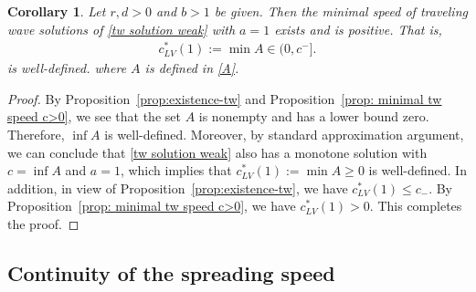 \documentclass[11pt,a4paper]{article}
\newtheorem{corollary}[theorem]{\textbf{Corollary}}
\numberwithin{equation}{section}
\numberwithin{figure}{section}
\newcommand\beaa{\begin{eqnarray*}}
\newcommand\eeaa{\end{eqnarray*}}
\begin{document}
\begin{corollary}\label{cor:c_lv(1)}
Let $r,d>0$ and $b>1$ be given. Then the minimal speed of traveling wave solutions
of \eqref{tw solution weak} with $a=1$ exists and is positive. That is, 
\beaa
c^{*}_{LV}(1):=\min A\in(0, c^-].
\eeaa
is well-defined.
where $A$ is defined in \eqref{A}.
\end{corollary}
\begin{proof}
By Proposition~\ref{prop:existence-tw} and Proposition~\ref{prop: minimal tw speed c>0},
we see that the set $A$ is nonempty and has a lower bound zero. Therefore, 
$\inf A$ is well-defined. Moreover, by standard approximation argument, 
we can conclude that \eqref{tw solution weak} also has a monotone solution with $c=\inf A$ and $a=1$, which implies that $c^{*}_{LV}(1):=\min A\geq0$ is well-defined. 
In addition, in view of Proposition~\ref{prop:existence-tw}, we have $c^{*}_{LV}(1)\leq c_-$. By Proposition~\ref{prop: minimal tw speed c>0}, we have 
$c^{*}_{LV}(1)>0$. This completes the proof.
\end{proof}



\subsection{Continuity of the spreading speed}
\end{document}
